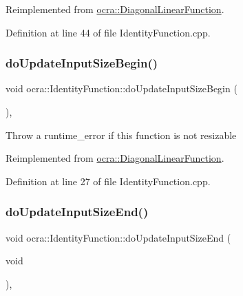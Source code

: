 Reimplemented from \hyperlink{classocra_1_1DiagonalLinearFunction_a0673bfe405d5637182c4749dd2737e95}{ocra\+::\+Diagonal\+Linear\+Function}.



Definition at line 44 of file Identity\+Function.\+cpp.

\hypertarget{classocra_1_1IdentityFunction_aa8d5ff0e25422b3b5a4a2a8621120790}{}\label{classocra_1_1IdentityFunction_aa8d5ff0e25422b3b5a4a2a8621120790} 
\subsubsection{\texorpdfstring{do\+Update\+Input\+Size\+Begin()}{doUpdateInputSizeBegin()}}
{\footnotesize\ttfamily void ocra\+::\+Identity\+Function\+::do\+Update\+Input\+Size\+Begin (\begin{DoxyParamCaption}{ }\end{DoxyParamCaption})\hspace{0.3cm}{\ttfamily [protected]}, {\ttfamily [virtual]}}

Throw a runtime\+\_\+error if this function is not resizable 

Reimplemented from \hyperlink{classocra_1_1DiagonalLinearFunction_a2071e4c52785c88119917460b94773cb}{ocra\+::\+Diagonal\+Linear\+Function}.



Definition at line 27 of file Identity\+Function.\+cpp.

\hypertarget{classocra_1_1IdentityFunction_adcfa8a32491113a590e7066f0062fbc6}{}\label{classocra_1_1IdentityFunction_adcfa8a32491113a590e7066f0062fbc6} 
\subsubsection{\texorpdfstring{do\+Update\+Input\+Size\+End()}{doUpdateInputSizeEnd()}}
{\footnotesize\ttfamily void ocra\+::\+Identity\+Function\+::do\+Update\+Input\+Size\+End (\begin{DoxyParamCaption}\item[{void}]{ }\end{DoxyParamCaption})\hspace{0.3cm}{\ttfamily [protected]}, {\ttfamily [virtual]}}

